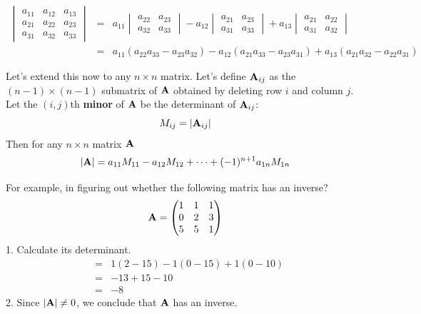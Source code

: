 \documentclass[]{book}
\theoremstyle{definition}
\theoremstyle{definition}
\theoremstyle{definition}
\theoremstyle{remark}
\begin{document}
\begin{eqnarray*}
            \begin{vmatrix} a_{11}&a_{12}&a_{13}\\  a_{21} & a_{22}&a_{23}\\ a_{31}&a_{32}&a_{33} \end{vmatrix} 
                &=& 
                a_{11} \begin{vmatrix} a_{22}&a_{23}\\ a_{32}&a_{33} \end{vmatrix}
                - a_{12} \begin{vmatrix} a_{21}&a_{23}\\ a_{31}&a_{33} \end{vmatrix}
                + a_{13} \begin{vmatrix} a_{21}&a_{22}\\ a_{31}&a_{32} 
                \end{vmatrix}\\
                &=& a_{11}(a_{22}a_{33} - a_{23}a_{32}) - a_{12}(a_{21}a_{33} - a_{23}a_{31}) + a_{13}(a_{21}a_{32} - a_{22}a_{31})
\end{eqnarray*}

Let's extend this now to any \(n\times n\) matrix. Let's define \({\bf A}_{ij}\) as the \((n-1)\times (n-1)\) submatrix of \({\bf A}\) obtained by deleting row \(i\) and column \(j\). Let the \((i,j)\)th \textbf{minor} of \({\bf A}\) be the determinant of \({\bf A}_{ij}\):
\[M_{ij}=|{\bf A}_{ij}|\]
Then for any \(n\times n\) matrix \({\bf A}\)
\[|{\bf A}|= a_{11}M_{11} - a_{12}M_{12} + \cdots + (-1)^{n+1} a_{1n} M_{1n}\]

For example, in figuring out whether the following matrix has an inverse?
\[{\bf A}=\begin{pmatrix} 1&1&1\\0&2&3\\5&5&1 \end{pmatrix}\]
1. Calculate its determinant.
\begin{eqnarray}
                &=& 1(2-15) - 1(0-15) + 1(0-10) \nonumber\\
                &=& -13+15-10 \nonumber\\
                &=& -8\nonumber
\end{eqnarray}
2. Since \(|{\bf A}|\ne 0\), we conclude that \({\bf A}\) has an inverse.
\end{document}
